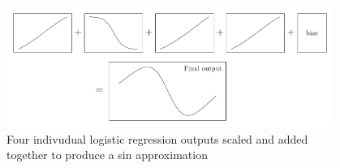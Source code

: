 \documentclass[twoside,11pt]{report}
\begin{document}
    \begin{figure}
        \begin{center}
            \includegraphics[width=0.95\textwidth]{tikzfigures/universal.pdf}
        \end{center}
        \caption{Four indivudual logistic regression outputs scaled and added together to produce 
        a sin approximation}\label{fig:universal}
    \end{figure}






\vskip 0.2in

% 

\end{document}
